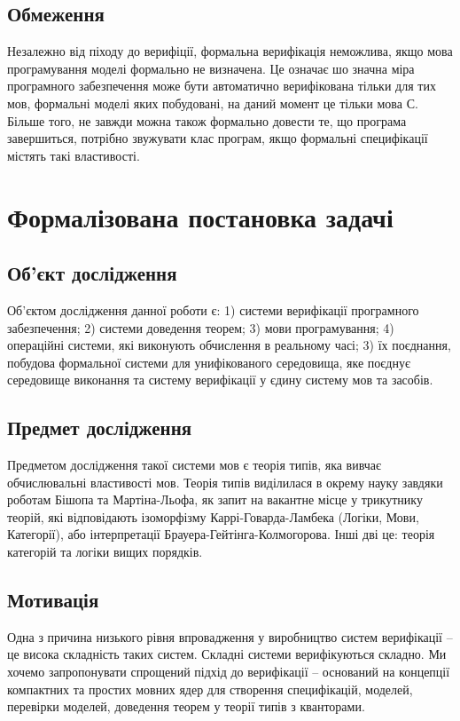 \documentclass{article}
\begin{document}
\subsection{Обмеження}
Незалежно від піходу до верифіції, формальна верифікація неможлива,
якщо мова програмування моделі формально не визначена. Це означає шо значна міра
програмного забезпечення може бути автоматично верифікована тільки для тих мов,
формальні моделі яких побудовані, на даний момент це тільки мова С.
Більше того, не завжди можна також формально довести те, що програма завершиться,
потрібно звужувати клас програм, якщо формальні специфікації містять такі властивості.

\section{Формалізована постановка задачі}

\subsection{Об'єкт дослідження}
Об'єктом дослідження данної роботи є:
1) системи верифікації програмного забезпечення;
2) системи доведення теорем;
3) мови програмування;
4) операційні системи, які виконують обчислення в реальному часі;
3) їх поєднання, побудова формальної системи для
унифікованого середовища, яке поєднує середовище виконання та систему
верифікації у єдину систему мов та засобів.

\subsection{Предмет дослідження}
Предметом дослідження такої системи мов є теорія типів, яка вивчає обчислювальні властивості мов.
Теорія типів виділилася в окрему науку завдяки роботам Бішопа та Мартіна-Льофа, як запит на вакантне місце у
трикутнику теорій, які відповідають ізоморфізму Каррі-Говарда-Ламбека (Логіки, Мови, Категорії),
або інтерпретації Брауера-Гейтінга-Колмогорова. Інші дві це: теорія категорій та логіки вищих порядків.

\subsection{Мотивація}
Одна з причина низького рівня впровадження у виробництво систем
верифікації -- це висока складність таких систем. Складні системи
верифікуються складно. Ми хочемо запропонувати спрощений
підхід до верифікації -- оснований на концепції компактних
та простих мовних ядер для створення специфікацій, моделей,
перевірки моделей, доведення теорем у теорії типів з кванторами.
\end{document}
